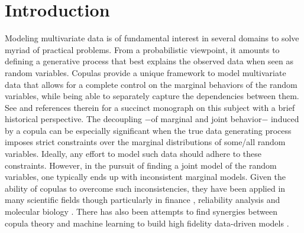 \documentclass{article}
\theoremstyle{plain}
\theoremstyle{definition}
\theoremstyle{remark}
\begin{document}
\begin{abstract}

\end{abstract}

 


 


\section{Introduction}\label{sec:Intro}

Modeling multivariate data is of fundamental interest in several domains to solve myriad of practical problems. From a probabilistic viewpoint, it amounts to defining a generative process that best explains the observed data when seen as random variables. Copulas provide a unique framework to model multivariate data that allows for a complete control on the marginal behaviors of the random variables, while being able to separately capture the dependencies between them. See \citep{Durante2010CopulaIntro} and references therein for a succinct monograph on this subject with a brief historical perspective.  The decoupling $-$of marginal and joint behavior$-$ induced by a copula can be especially significant when the true data generating process imposes strict constraints over the marginal distributions of some/all random variables. Ideally, any effort to model such data should adhere to these constraints. However, in the pursuit of finding a joint model of the random variables, one typically ends up with inconsistent marginal models.  Given the ability of copulas to overcome such inconsistencies, they have been applied in many scientific fields though particularly in finance \citep{Genest2009CopulaInFinance,Cherubini2004copula}, reliability analysis \citep{Rychlik2010Reliability} and molecular biology \citep{Bilgrau2012quantification,Li2011,Kim2008,Ma2012Gini}.  There has also been  attempts to find synergies between copula theory and machine learning to build high fidelity data-driven models \citep[see][for a survey on the applications of copulas in machine learning approaches]{Elidan2013}.
\end{document}
